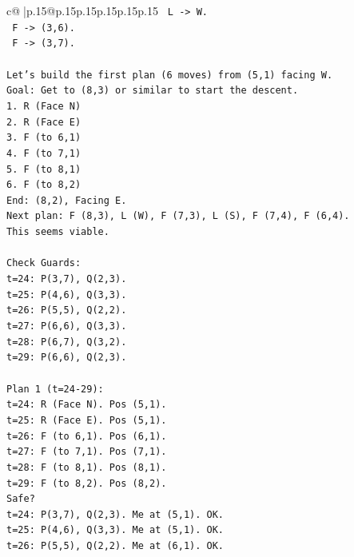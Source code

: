 \documentclass{article}
\begin{document}
{\begin{supertabular}{c@{$\;$}|p{.15\linewidth}@{}p{.15\linewidth}p{.15\linewidth}p{.15\linewidth}p{.15\linewidth}p{.15\linewidth}}
{{{\texttt{   L {-}> W.} \\
\texttt{   F {-}> (3,6).} \\
\texttt{   F {-}> (3,7).} \\
\\ 
\texttt{Let's build the first plan (6 moves) from (5,1) facing W.} \\
\texttt{Goal: Get to (8,3) or similar to start the descent.} \\
\texttt{1. R (Face N)} \\
\texttt{2. R (Face E)} \\
\texttt{3. F (to 6,1)} \\
\texttt{4. F (to 7,1)} \\
\texttt{5. F (to 8,1)} \\
\texttt{6. F (to 8,2)} \\
\texttt{End: (8,2), Facing E.} \\
\texttt{Next plan: F (8,3), L (W), F (7,3), L (S), F (7,4), F (6,4).} \\
\texttt{This seems viable.} \\
\\ 
\texttt{Check Guards:} \\
\texttt{t=24: P(3,7), Q(2,3).} \\
\texttt{t=25: P(4,6), Q(3,3).} \\
\texttt{t=26: P(5,5), Q(2,2).} \\
\texttt{t=27: P(6,6), Q(3,3).} \\
\texttt{t=28: P(6,7), Q(3,2).} \\
\texttt{t=29: P(6,6), Q(2,3).} \\
\\ 
\texttt{Plan 1 (t=24{-}29):} \\
\texttt{t=24: R (Face N). Pos (5,1).} \\
\texttt{t=25: R (Face E). Pos (5,1).} \\
\texttt{t=26: F (to 6,1). Pos (6,1).} \\
\texttt{t=27: F (to 7,1). Pos (7,1).} \\
\texttt{t=28: F (to 8,1). Pos (8,1).} \\
\texttt{t=29: F (to 8,2). Pos (8,2).} \\
\texttt{Safe?} \\
\texttt{t=24: P(3,7), Q(2,3). Me at (5,1). OK.} \\
\texttt{t=25: P(4,6), Q(3,3). Me at (5,1). OK.} \\
\texttt{t=26: P(5,5), Q(2,2). Me at (6,1). OK.} \\
}}}
\end{supertabular}}
\end{document}
